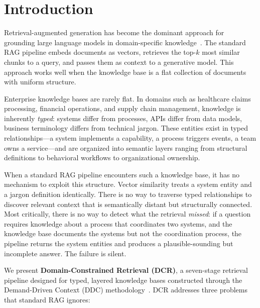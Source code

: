 \documentclass[11pt,a4paper]{article}
\begin{document}
\vspace{1em}

\section{Introduction}
\label{sec:introduction}

Retrieval-augmented generation has become the dominant approach for grounding large language models in domain-specific knowledge~\citep{lewis2020rag}. The standard RAG pipeline embeds documents as vectors, retrieves the top-$k$ most similar chunks to a query, and passes them as context to a generative model. This approach works well when the knowledge base is a flat collection of documents with uniform structure.

Enterprise knowledge bases are rarely flat. In domains such as healthcare claims processing, financial operations, and supply chain management, knowledge is inherently \emph{typed}: systems differ from processes, APIs differ from data models, business terminology differs from technical jargon. These entities exist in typed relationships---a system implements a capability, a process triggers events, a team owns a service---and are organized into semantic layers ranging from structural definitions to behavioral workflows to organizational ownership.

When a standard RAG pipeline encounters such a knowledge base, it has no mechanism to exploit this structure. Vector similarity treats a system entity and a jargon definition identically. There is no way to traverse typed relationships to discover relevant context that is semantically distant but structurally connected. Most critically, there is no way to detect what the retrieval \emph{missed}: if a question requires knowledge about a process that coordinates two systems, and the knowledge base documents the systems but not the coordination process, the pipeline returns the system entities and produces a plausible-sounding but incomplete answer. The failure is silent.

We present \textbf{Domain-Constrained Retrieval (DCR)}, a seven-stage retrieval pipeline designed for typed, layered knowledge bases constructed through the Demand-Driven Context (DDC) methodology~\citep{navakoti2026ddc}. DCR addresses three problems that standard RAG ignores:
\end{document}
